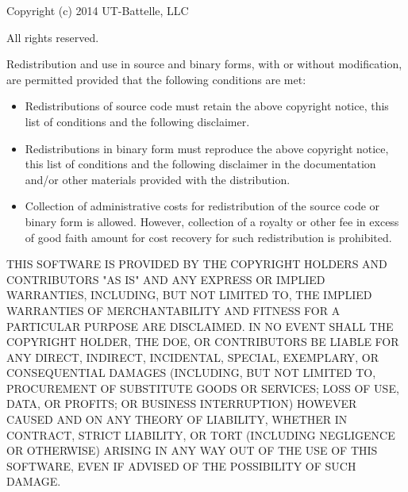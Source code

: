 \documentclass[11pt]{amsart}
\begin{document}
Copyright (c) 2014 UT-Battelle, LLC

All rights reserved.


Redistribution and use in source and binary forms, with or without modification, are permitted provided that the following conditions are met:
\begin{itemize}
\item Redistributions of source code must retain the above copyright notice, this list of conditions and the following disclaimer.
\item Redistributions in binary form must reproduce the above copyright notice, this list of conditions and the following disclaimer in the documentation and/or other materials provided with the distribution.
\item Collection of administrative costs for redistribution of the source code or binary form is allowed. However, collection of a royalty or other fee in excess of good faith amount for cost recovery for such redistribution is prohibited.
\end{itemize}

THIS SOFTWARE IS PROVIDED BY THE COPYRIGHT HOLDERS AND CONTRIBUTORS "AS IS" AND ANY EXPRESS OR IMPLIED WARRANTIES, INCLUDING, BUT NOT LIMITED TO, THE IMPLIED WARRANTIES OF MERCHANTABILITY AND FITNESS FOR A PARTICULAR PURPOSE ARE DISCLAIMED. 
IN NO EVENT SHALL THE COPYRIGHT HOLDER, THE DOE, OR CONTRIBUTORS BE LIABLE FOR ANY DIRECT, INDIRECT, INCIDENTAL, SPECIAL, EXEMPLARY, OR CONSEQUENTIAL DAMAGES (INCLUDING, BUT NOT LIMITED TO, PROCUREMENT OF SUBSTITUTE GOODS OR SERVICES; LOSS OF USE, DATA, OR PROFITS; OR BUSINESS INTERRUPTION) HOWEVER CAUSED AND ON ANY THEORY OF LIABILITY, WHETHER IN CONTRACT, STRICT LIABILITY, OR TORT (INCLUDING NEGLIGENCE OR OTHERWISE) ARISING IN ANY WAY OUT OF THE USE OF THIS SOFTWARE, EVEN IF ADVISED OF THE POSSIBILITY OF SUCH DAMAGE.
\end{document}
